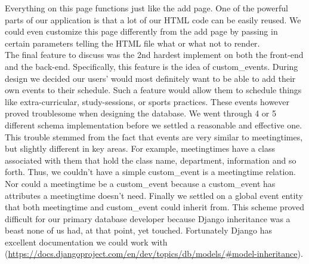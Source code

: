 \documentclass[pdftex,12pt,letter]{article}
\begin{document}
Everything on this page functions just like the add page. One of the powerful parts of our application is that a lot of our HTML code can be easily reused. We could even customize this page differently from the add page by passing in certain parameters telling the HTML file what or what not to render.\\

The final feature to discuss was the 2nd hardest implement on both the front-end and the back-end. Specifically, this feature is the idea of custom\_events. During design we decided our users' would most definitely want to be able to add their own events to their schedule. Such a feature would allow them to schedule things like extra-curricular, study-sessions, or sports practices. These events however proved troublesome when designing the database. We went through 4 or 5 different schema implementation before we settled a reasonable and effective one. This trouble stemmed from the fact that events are very similar to meetingtimes, but slightly different in key areas. For example, meetingtimes have a class associated with them that hold the class name, department, information and so forth. Thus, we couldn't have a simple custom\_event is a meetingtime relation. Nor could a meetingtime be a custom\_event because a custom\_event has attributes a meetingtime doesn't need. Finally we settled on a global event entity that both meetingtime and custom\_event could inherit from. This scheme proved difficult for our primary database developer because Django inheritance was a beast none of us had, at that point, yet touched. Fortunately Django has excellent documentation we could work with (\url{https://docs.djangoproject.com/en/dev/topics/db/models/#model-inheritance}).\\
\end{document}

